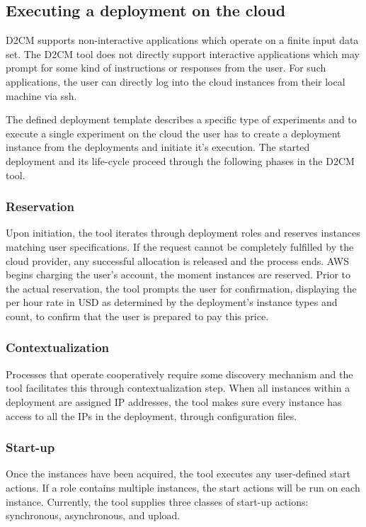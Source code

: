 \documentclass[a4paper,10pt]{article}
\begin{document}
\subsection{Executing a deployment on the cloud}



D2CM supports non-interactive applications which operate on a finite input data set. The D2CM tool does not directly support interactive applications which may prompt for some kind of instructions or responses from the user. For such applications, the user can directly log into the cloud instances from their local machine via ssh. 

The defined deployment template describes a specific type of experiments and to execute a single experiment on the cloud the user has to create a deployment instance from the deployments and initiate it's execution. The started deployment and its life-cycle proceed through the following phases in the D2CM tool.

\subsubsection{Reservation} 
Upon initiation, the tool iterates through deployment roles and reserves instances matching user specifications. If the request cannot be completely fulfilled by the cloud provider, any successful allocation is released and the process ends. AWS begins charging the user's account, the moment instances are reserved. Prior to the actual reservation, the tool prompts the user for confirmation, displaying the per hour rate in USD as determined by the deployment's instance types and count, to confirm that the user is prepared to pay this price. 

\subsubsection{Contextualization}
Processes that operate cooperatively require some discovery mechanism and the tool facilitates this through contextualization step. When all instances within a deployment are assigned IP addresses, the tool makes sure every instance has access to all the IPs in the deployment, through configuration files. 



\subsubsection{Start-up}
Once the instances have been acquired, the tool executes any user-defined start actions. If a role contains multiple instances, the start actions will be run on each instance. Currently, the tool supplies three classes of start-up actions: synchronous, asynchronous, and upload. 
\end{document}
